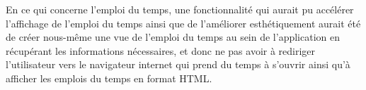 En ce qui concerne l’emploi du temps, une fonctionnalité qui aurait pu accélérer l’affichage de l’emploi du temps ainsi que de l’améliorer esthétiquement aurait été de créer nous-même une vue de l’emploi du temps au sein de l’application en récupérant les informations nécessaires, et donc ne pas avoir à rediriger l’utilisateur vers le navigateur internet qui prend du temps à s’ouvrir ainsi qu’à afficher les emplois du temps en format HTML.\\